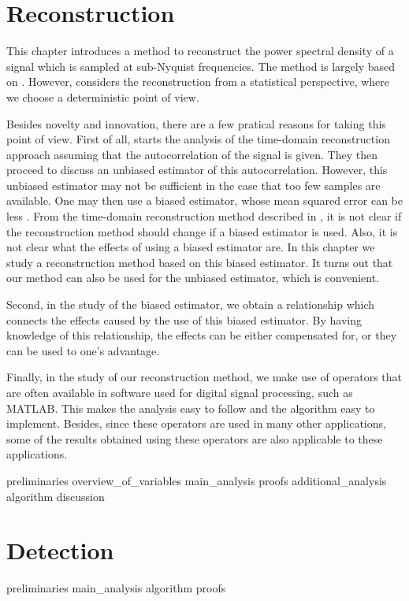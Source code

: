 \documentclass[a4paper, openany, oneside]{memoir}
\begin{document}
\chapter{Reconstruction}
This chapter introduces a method to reconstruct the power spectral density of a signal which is sampled at sub-Nyquist frequencies. The method is largely based on \cite{ariananda2012compressive}. However, \cite{ariananda2012compressive} considers the reconstruction from a statistical perspective, where we choose a deterministic point of view.

Besides novelty and innovation, there are a few pratical reasons for taking this point of view. First of all, \cite{ariananda2012compressive} starts the analysis of the time-domain reconstruction approach assuming that the autocorrelation of the signal is given. They then proceed to discuss an unbiased estimator of this autocorrelation. However, this unbiased estimator may not be sufficient in the case that too few samples are available. One may then use a biased estimator, whose mean squared error can be less \cite{percival1993univariate}. From the time-domain reconstruction method described in \cite{ariananda2012compressive}, it is not clear if the reconstruction method should change if a biased estimator is used. Also, it is not clear what the effects of using a biased estimator are. In this chapter we study a reconstruction method based on this biased estimator. It turns out that our method can also be used for the unbiased estimator, which is convenient.

Second, in the study of the biased estimator, we obtain a relationship which connects the effects caused by the use of this biased estimator. By having knowledge of this relationship, the effects can be either compensated for, or they can be used to one's advantage.

Finally, in the study of our reconstruction method, we make use of operators that are often available in software used for digital signal processing, such as MATLAB. This makes the analysis easy to follow and the algorithm easy to implement. Besides, since these operators are used in many other applications, some of the results obtained using these operators are also applicable to these applications. 

{preliminaries}
{overview_of_variables}
{main_analysis}
{proofs}
{additional_analysis}
{algorithm}
{discussion}


\chapter{Detection}

{preliminaries}
{main_analysis}
{algorithm}
{proofs}
\end{document}
